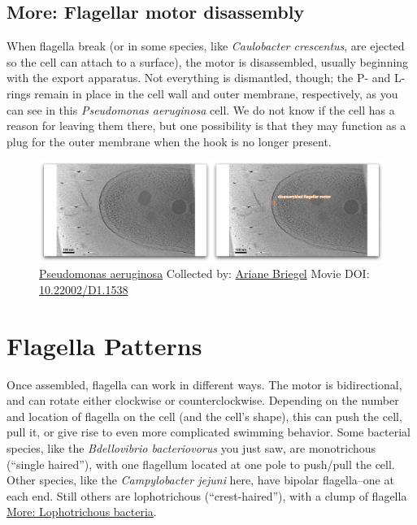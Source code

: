\documentclass[]{tufte-book}
\begin{document}
\hypertarget{Flagellar_motor_disassembly}{\subsection*{More: Flagellar
motor disassembly}\label{Flagellar_motor_disassembly}}

When flagella break (or in some species, like \emph{Caulobacter
crescentus}, are ejected so the cell can attach to a surface), the motor
is disassembled, usually beginning with the export apparatus. Not
everything is dismantled, though; the P- and L-rings remain in place in
the cell wall and outer membrane, respectively, as you can see in this
\emph{Pseudomonas aeruginosa} cell. We do not know if the cell has a
reason for leaving them there, but one possibility is that they may
function as a plug for the outer membrane when the hook is no longer
present.





\begin{figure}
\includegraphics{movie_stills/6_3a} \caption[\protect\hyperlink{tree}{Pseudomonas aeruginosa} Collected
by: \protect\hyperlink{ariane_briegel}{Ariane Briegel} Movie DOI:
\href{https://doi.org/10.22002/D1.1538}{10.22002/D1.1538}]{\protect\hyperlink{tree}{Pseudomonas aeruginosa} Collected
by: \protect\hyperlink{ariane_briegel}{Ariane Briegel} Movie DOI:
\href{https://doi.org/10.22002/D1.1538}{10.22002/D1.1538}}\label{fig:6-3a}
\end{figure}

\section{Flagella Patterns}\label{flagella-patterns}

Once assembled, flagella can work in different ways. The motor is
bidirectional, and can rotate either clockwise or counterclockwise.
Depending on the number and location of flagella on the cell (and the
cell's shape), this can push the cell, pull it, or give rise to even
more complicated swimming behavior. Some bacterial species, like the
\emph{Bdellovibrio bacteriovorus} you just saw, are monotrichous
(``single haired''), with one flagellum located at one pole to push/pull
the cell. Other species, like the \emph{Campylobacter jejuni} here, have
bipolar flagella--one at each end. Still others are lophotrichous
(``crest-haired''), with a clump of flagella
\protect\hyperlink{Lophotrichous_bacteria}{More: Lophotrichous
bacteria}.
\end{document}
